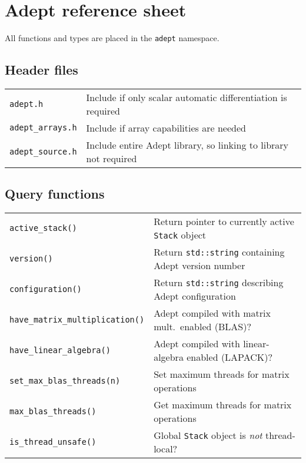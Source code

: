 \documentclass[10pt,a4,landscape]{article}
\def\myfont{\fontfamily{cmss}\fontseries{lmtt}\selectfont}
\def\mysize{\footnotesize}
\def\mysize{\small}
\def\code#1{\texttt{#1}}
\begin{document}
\pagestyle{empty}
\twocolumn
\mysize\myfont\section*{\Huge Adept reference sheet}
All functions and types are placed in the \code{adept} namespace.
\subsection*{Header files}
\begin{tabular}{ll}
\code{adept.h} & Include if only scalar automatic differentiation is required\\
\code{adept\_arrays.h} & Include if array capabilities are needed \\
\code{adept\_source.h} & Include entire Adept library, so linking to library not required \\
\end{tabular}

\subsection*{Query functions}
\begin{tabular}{ll}
\code{active\_stack()} & Return pointer to currently active \code{Stack} object\\
\code{version()} & Return \code{std::string} containing Adept version number\\
\code{configuration()} & Return \code{std::string} describing Adept configuration\\
\code{have\_matrix\_multiplication()} & Adept compiled with matrix mult.\ enabled (BLAS)?\\
\code{have\_linear\_algebra()} & Adept compiled with linear-algebra enabled (LAPACK)?\\
\code{set\_max\_blas\_threads(n)} & Set maximum threads for matrix operations\\
\code{max\_blas\_threads()} & Get maximum threads for matrix operations\\
\code{is\_thread\_unsafe()} & Global \code{Stack} object is \textit{not} thread-local?\\
\end{tabular}
\end{document}

